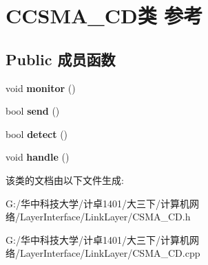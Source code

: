 \hypertarget{class_c_c_s_m_a___c_d}{}\section{C\+C\+S\+M\+A\+\_\+\+C\+D类 参考}
\label{class_c_c_s_m_a___c_d}
\subsection*{Public 成员函数}
\begin{DoxyCompactItemize}
\item 
\mbox{\label{class_c_c_s_m_a___c_d_a270a833b070a834dbf2c1f997ea85ee6}} 
void {\bfseries monitor} ()
\item 
\mbox{\label{class_c_c_s_m_a___c_d_a630a99c3ee32298d8c217a3fc2e2d65c}} 
bool {\bfseries send} ()
\item 
\mbox{\label{class_c_c_s_m_a___c_d_a152628ee66959e6a2594250f51148be4}} 
bool {\bfseries detect} ()
\item 
\mbox{\label{class_c_c_s_m_a___c_d_a5ace5c0de3305086cd7ee31e6f601cd3}} 
void {\bfseries handle} ()
\end{DoxyCompactItemize}


该类的文档由以下文件生成\+:\begin{DoxyCompactItemize}
\item 
G\+:/华中科技大学/计卓1401/大三下/计算机网络/\+Layer\+Interface/\+Link\+Layer/C\+S\+M\+A\+\_\+\+C\+D.\+h\item 
G\+:/华中科技大学/计卓1401/大三下/计算机网络/\+Layer\+Interface/\+Link\+Layer/C\+S\+M\+A\+\_\+\+C\+D.\+cpp\end{DoxyCompactItemize}
